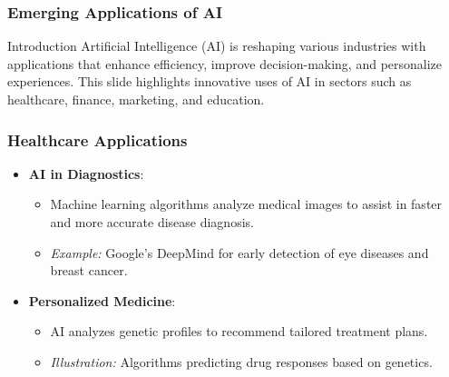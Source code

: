 \documentclass[aspectratio=169]{beamer}
\begin{document}
\begin{frame}[fragile]
    \frametitle{Emerging Applications of AI}
    \begin{block}{Introduction}
        Artificial Intelligence (AI) is reshaping various industries with applications that enhance efficiency, improve decision-making, and personalize experiences. This slide highlights innovative uses of AI in sectors such as healthcare, finance, marketing, and education.
    \end{block}
\end{frame}

\begin{frame}[fragile]
    \frametitle{Healthcare Applications}
    \begin{itemize}
        \item \textbf{AI in Diagnostics}:
        \begin{itemize}
            \item Machine learning algorithms analyze medical images to assist in faster and more accurate disease diagnosis.
            \item \textit{Example:} Google's DeepMind for early detection of eye diseases and breast cancer.
        \end{itemize}
        
        \item \textbf{Personalized Medicine}:
        \begin{itemize}
            \item AI analyzes genetic profiles to recommend tailored treatment plans.
            \item \textit{Illustration:} Algorithms predicting drug responses based on genetics.
        \end{itemize}
    \end{itemize}
\end{frame}
\end{document}
